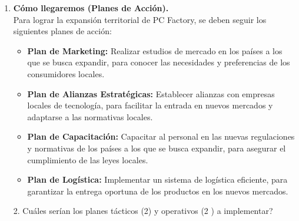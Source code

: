 \documentclass{templateNote}
\begin{document}
\begin{enumerate}[label=\alph*)]
    \item \textbf{Cómo llegaremos (Planes de Acción).} \\
    \noindent Para lograr la expansión territorial de PC Factory, se deben seguir los siguientes planes de acción:
    \begin{itemize}
        \item \textbf{Plan de Marketing:} Realizar estudios de mercado en los países a los que se busca expandir, para conocer las necesidades y preferencias de los consumidores locales.
        \item \textbf{Plan de Alianzas Estratégicas:} Establecer alianzas con empresas locales de tecnología, para facilitar la entrada en nuevos mercados y adaptarse a las normativas locales.
        \item \textbf{Plan de Capacitación:} Capacitar al personal en las nuevas regulaciones y normativas de los países a los que se busca expandir, para asegurar el cumplimiento de las leyes locales.
        \item \textbf{Plan de Logística:} Implementar un sistema de logística eficiente, para garantizar la entrega oportuna de los productos en los nuevos mercados.
    \end{itemize}
    
\end{enumerate}

\newpage
\begin{enumerate}
    \item[2.] Cuáles serían los planes tácticos (2) y operativos (2 ) a implementar?
\end{enumerate} 
\end{document}
